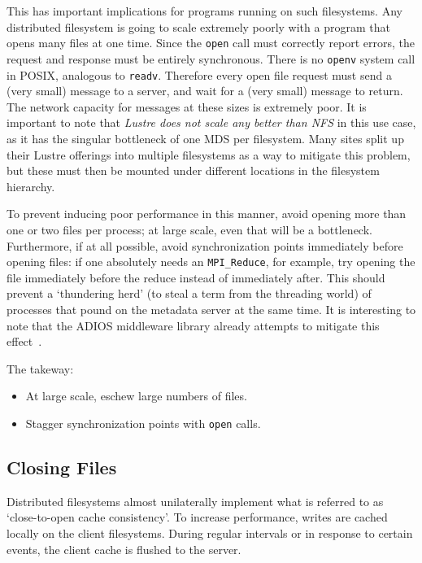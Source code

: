 This has important implications for programs running on such
filesystems.  Any distributed filesystem is going to scale extremely
poorly with a program that opens many files at one time.  Since the
\verb!open! call must correctly report errors, the request and response
must be entirely synchronous.  There is no \verb!openv! system call in
POSIX, analogous to \verb!readv!.  Therefore every open file request
must send a (very small) message to a server, and wait for a (very
small) message to return.  The network capacity for messages at these
sizes is extremely poor.  It is important to note that \emph{Lustre
does not scale any better than NFS} in this use case, as it has the
singular bottleneck of one MDS per filesystem.  Many sites split up
their Lustre offerings into multiple filesystems as a way to mitigate
this problem, but these must then be mounted under different
locations in the filesystem hierarchy.

To prevent inducing poor performance in this manner, avoid opening
more than one or two files per process; at large scale,
even that will be a bottleneck.  Furthermore, if at all possible,
avoid synchronization points immediately before opening files: if one
absolutely needs an \verb!MPI_Reduce!, for example, try opening the
file immediately before the reduce instead of immediately after.  This
should prevent a `thundering herd' (to steal a term from the threading
world) of processes that pound on the metadata server at the same
time.  It is interesting to note that the ADIOS middleware library
already attempts to mitigate this effect~\cite{ADIOS:Manual}.

The takeway:

\begin{itemize}
  \item At large scale, eschew large numbers of files.
  \item Stagger synchronization points with \verb!open! calls.
\end{itemize}

\subsection{Closing Files}

Distributed filesystems almost unilaterally implement what is referred
to as `close-to-open cache consistency'.  To increase performance,
writes are cached locally on the client filesystems.  During regular
intervals or in response to certain events, the client cache is flushed
to the server.

